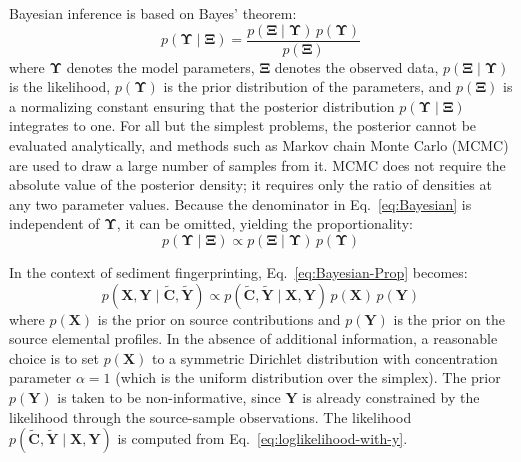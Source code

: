 Bayesian inference is based on Bayes' theorem:
\begin{equation}\label{eq:Bayesian}
    p(\bm{\Upsilon} \mid \bm{\Xi}) = \frac{p(\bm{\Xi} \mid \bm{\Upsilon})\, p(\bm{\Upsilon})}{p(\bm{\Xi})}
\end{equation}
where $\bm{\Upsilon}$ denotes the model parameters, $\bm{\Xi}$ denotes the observed data, $p(\bm{\Xi} \mid \bm{\Upsilon})$ is the likelihood, $p(\bm{\Upsilon})$ is the prior distribution of the parameters, and $p(\bm{\Xi})$ is a normalizing constant ensuring that the posterior distribution $p(\bm{\Upsilon} \mid \bm{\Xi})$ integrates to one. For all but the simplest problems, the posterior cannot be evaluated analytically, and methods such as Markov chain Monte Carlo (MCMC) are used to draw a large number of samples from it. MCMC does not require the absolute value of the posterior density; it requires only the ratio of densities at any two parameter values. Because the denominator in Eq.~\eqref{eq:Bayesian} is independent of $\bm{\Upsilon}$, it can be omitted, yielding the proportionality:
\begin{equation}\label{eq:Bayesian-Prop}
    p(\bm{\Upsilon} \mid \bm{\Xi}) \propto p(\bm{\Xi} \mid \bm{\Upsilon})\, p(\bm{\Upsilon})
\end{equation}

In the context of sediment fingerprinting, Eq.~\eqref{eq:Bayesian-Prop} becomes:
\begin{equation}\label{eq:Bayesian-Sediment}
    p(\mathbf{X}, \mathbf{Y} \mid \tilde{\mathbf{C}}, \tilde{\mathbf{Y}}) \propto p(\tilde{\mathbf{C}}, \tilde{\mathbf{Y}} \mid \mathbf{X}, \mathbf{Y})\, p(\mathbf{X})\, p(\mathbf{Y})
\end{equation}
where $p(\mathbf{X})$ is the prior on source contributions and $p(\mathbf{Y})$ is the prior on the source elemental profiles. In the absence of additional information, a reasonable choice is to set $p(\mathbf{X})$ to a symmetric Dirichlet distribution with concentration parameter $\alpha = 1$ (which is the uniform distribution over the simplex). The prior $p(\mathbf{Y})$ is taken to be non-informative, since $\mathbf{Y}$ is already constrained by the likelihood through the source-sample observations. The likelihood $p(\tilde{\mathbf{C}}, \tilde{\mathbf{Y}} \mid \mathbf{X}, \mathbf{Y})$ is computed from Eq.~\eqref{eq:loglikelihood-with-y}.

